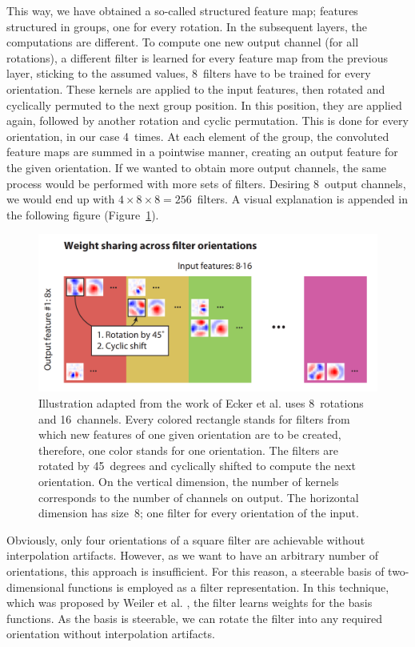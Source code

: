 This way, we have obtained a so-called structured feature map; features structured in groups, one for every rotation. In the subsequent layers, the computations are different. To compute one new output channel (for all rotations), a different filter is learned for every feature map from the previous layer, sticking to the assumed values, 8~filters have to be trained for every orientation. These kernels are applied to the input features, then rotated and cyclically permuted to the next group position. In this position, they are applied again, followed by another rotation and cyclic permutation. This is done for every orientation, in our case 4~times. At each element of the group, the convoluted feature maps are summed in a pointwise manner, creating an output feature for the given orientation. If we wanted to obtain more output channels, the same process would be performed with more sets of filters. Desiring 8~output channels, we would end up with $4\times8\times8 = 256$~filters. A visual explanation is appended in the following figure (Figure~\ref{img04:recnn}).

\begin{figure}[h]\centering
	\includegraphics[width=140mm]{../img/reCNN_visualization.png}
	\caption{Illustration adapted from the work of Ecker et al. \citep{ecker2018rotation} uses 8~rotations and 16~channels. Every colored rectangle stands for filters from which new features of one given orientation are to be created, therefore, one color stands for one orientation. The filters are rotated by 45~degrees and cyclically shifted to compute the next orientation. On the vertical dimension, the number of kernels corresponds to the number of channels on output. The horizontal dimension has size~8; one filter for every orientation of the input.}
	\label{img04:recnn}
\end{figure}


Obviously, only four orientations of a square filter are achievable without interpolation artifacts. However, as we want to have an arbitrary number of orientations, this approach is insufficient. For this reason, a steerable basis of two-dimensional functions is employed as a filter representation. In this technique, which was proposed by Weiler et al. \citep{weiler2018learning}, the filter learns weights for the basis functions. As the basis is steerable, we can rotate the filter into any required orientation without interpolation artifacts.

